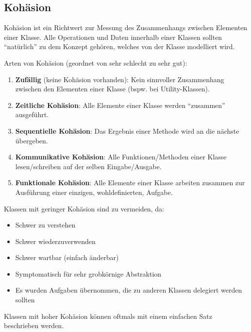 				
		
		\subsection{Kohäsion}
			Kohäsion ist ein Richtwert zur Messung des Zusammenhangs zwischen Elementen einer Klasse. Alle Operationen und Daten innerhalb einer Klassen sollten \enquote{natürlich} zu dem Konzept gehören, welches von der Klasse modelliert wird.

			Arten von Kohäsion (geordnet von sehr schlecht zu sehr gut):
			\begin{enumerate}
				\item \textbf{Zufällig} (keine Kohäsion vorhanden): Kein sinnvoller Zusammenhang zwischen den Elementen einer Klasse (bspw. bei Utility-Klassen).
				\item \textbf{Zeitliche Kohäsion}: Alle Elemente einer Klasse werden \enquote{zusammen} ausgeführt.
				\item \textbf{Sequentielle Kohäsion}: Das Ergebnis einer Methode wird an die nächste übergeben.
				\item \textbf{Kommunikative Kohäsion}: Alle Funktionen/Methoden einer Klasse lesen/schreiben auf der selben Eingabe/Ausgabe.
				\item \textbf{Funktionale Kohäsion}: Alle Elemente einer Klasse arbeiten zusammen zur Ausführung einer einzigen, wohldefinierten, Aufgabe.
			\end{enumerate}
			
			Klassen mit geringer Kohäsion sind zu vermeiden, da:
			\begin{itemize}
				\item Schwer zu verstehen
				\item Schwer wiederzuverwenden
				\item Schwer wartbar (einfach änderbar)
				\item Symptomatisch für sehr grobkörnige Abstraktion
				\item Es wurden Aufgaben übernommen, die zu anderen Klassen delegiert werden sollten
			\end{itemize}
			Klassen mit hoher Kohäsion können oftmals mit einem einfachen Satz beschrieben werden.
			
